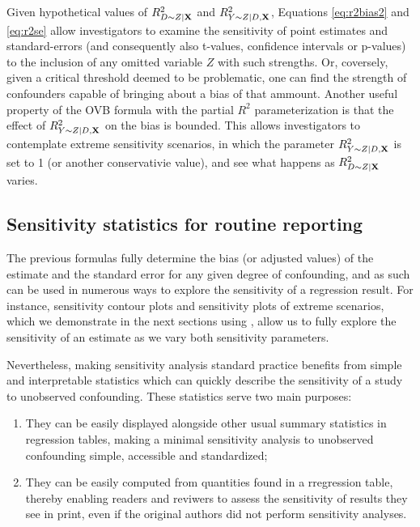 \documentclass[
]{jss}
\begin{document}
Given hypothetical values of \(R^2_{D\sim Z | {\bf X}}\) and
\(R^2_{Y\sim Z|D, {\bf X}}\), Equations \ref{eq:r2bias2} and
\ref{eq:r2se} allow investigators to examine the sensitivity of point
estimates and standard-errors (and consequently also t-values,
confidence intervals or p-values) to the inclusion of any omitted
variable \(Z\) with such strengths. Or, coversely, given a critical
threshold deemed to be problematic, one can find the strength of
confounders capable of bringing about a bias of that ammount. Another
useful property of the OVB formula with the partial \(R^2\)
parameterization is that the effect of \(R^2_{Y\sim Z|D, {\bf X}}\) on
the bias is bounded. This allows investigators to contemplate extreme
sensitivity scenarios, in which the parameter
\(R^2_{Y\sim Z|D, {\bf X}}\) is set to 1 (or another conservativie
value), and see what happens as \(R^2_{D\sim Z | {\bf X}}\) varies.

\hypertarget{rv-and-r2yd}{%
\subsection{Sensitivity statistics for routine
reporting}\label{rv-and-r2yd}}

The previous formulas fully determine the bias (or adjusted values) of
the estimate and the standard error for any given degree of confounding,
and as such can be used in numerous ways to explore the sensitivity of a
regression result. For instance, sensitivity contour plots and
sensitivity plots of extreme scenarios, which we demonstrate in the next
sections using , allow us to fully explore the
sensitivity of an estimate as we vary both sensitivity parameters.

Nevertheless, making sensitivity analysis standard practice benefits
from simple and interpretable statistics which can quickly describe the
sensitivity of a study to unobserved confounding. These statistics serve
two main purposes:

\begin{enumerate}
\def\labelenumi{\arabic{enumi}.}
\item
  They can be easily displayed alongside other usual summary statistics
  in regression tables, making a minimal sensitivity analysis to
  unobserved confounding simple, accessible and standardized;
\item
  They can be easily computed from quantities found in a rregression
  table, thereby enabling readers and reviwers to assess the sensitivity
  of results they see in print, even if the original authors did not
  perform sensitivity analyses.
\end{enumerate}
\end{document}
